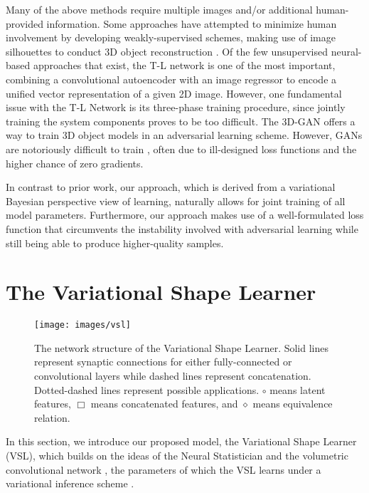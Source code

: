 \documentclass[10pt,twocolumn,letterpaper]{article}
\begin{document}
Many of the above methods require multiple images and/or additional human-provided information. Some approaches have attempted to minimize human involvement by developing weakly-supervised schemes, making use of image silhouettes to conduct 3D object reconstruction \cite{yan2016perspective,Wiles2017SilNetS}. Of the few unsupervised neural-based approaches that exist, the T-L network \cite{girdhar2016learning} is one of the most important, combining a convolutional autoencoder with an image regressor to encode a unified vector representation of a given 2D image. However, one fundamental issue with the T-L Network is its three-phase training procedure, since jointly training the system components proves to be too difficult. The 3D-GAN \cite{wu2016learning} offers a way to train 3D object models in an adversarial learning scheme. However, GANs are notoriously difficult to train \cite{arjovsky2017towards}, often due to ill-designed loss functions and the higher chance of zero gradients.

In contrast to prior work, our approach, which is derived from a variational Bayesian perspective view of learning, naturally allows for joint training of all model parameters. Furthermore, our approach makes use of a well-formulated loss function that circumvents the instability involved with adversarial learning while still being able to produce higher-quality samples.

\section{The Variational Shape Learner}
\label{sec:arch}
\begin{figure*}[ht!]
  \centering
  \texttt{[image: images/vsl]}
  \caption{The network structure of the Variational Shape Learner. Solid lines represent synaptic connections for either fully-connected or convolutional layers while dashed lines represent concatenation. Dotted-dashed lines represent possible applications. $\circ$ means latent features, $\Box$ means concatenated features, and $\diamond$ means equivalence relation.}
  \label{fig:vsl}
\end{figure*}

In this section, we introduce our proposed model, the Variational Shape Learner (VSL), which builds on the ideas of the Neural Statistician  \cite{edwards2016towards} and the volumetric convolutional network \cite{maturana2015voxnet}, the parameters of which the VSL learns under a variational inference scheme \cite{kingma2013auto}.
\end{document}
